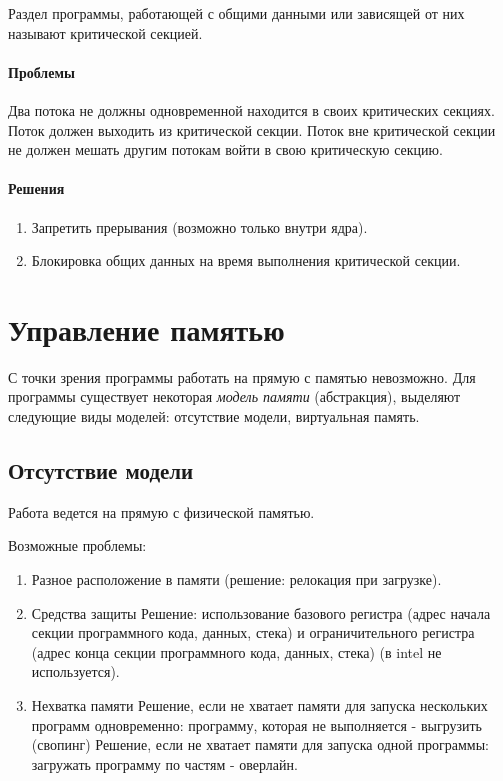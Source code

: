 \documentclass[]{article}
\begin{document}
		Раздел программы, работающей с общими данными или зависящей от них называют критической секцией.
		
		\paragraph{Проблемы}
		Два потока не должны одновременной находится в своих критических секциях. Поток должен выходить из критической секции. Поток вне критической секции не должен мешать другим потокам войти в свою критическую секцию.
		
		\paragraph{Решения}
		\begin{enumerate}
			\item Запретить прерывания (возможно только внутри ядра).
			\item Блокировка общих данных на время выполнения критической секции.
		\end{enumerate}
		
	\section{Управление памятью}
		С точки зрения  программы работать на прямую с памятью невозможно. Для программы существует некоторая \textit{модель памяти} (абстракция), выделяют следующие виды моделей: отсутствие модели, виртуальная память.
		
			\subsection{Отсутствие модели}
			Работа ведется на прямую с физической памятью.
			
			Возможные проблемы:
			\begin{enumerate}
				\item Разное расположение в памяти (решение: релокация при загрузке).
				\item Средства защиты
				\subitem Решение: использование базового регистра (адрес начала секции программного кода, данных, стека) и ограничительного регистра (адрес конца секции программного кода, данных, стека) (в intel не используется).
				\item Нехватка памяти
				\subitem Решение, если не хватает памяти для запуска нескольких программ одновременно: программу, которая не выполняется - выгрузить (свопинг)
				\subitem Решение, если не хватает памяти для запуска одной программы: загружать программу по частям - оверлайн.
			\end{enumerate}
			
\end{document}
